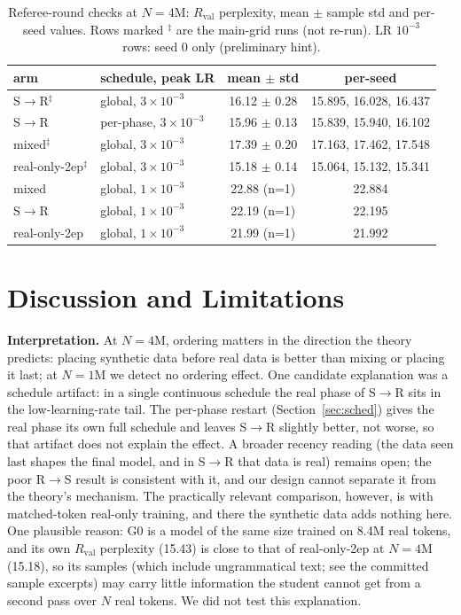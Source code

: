 \documentclass[conference]{IEEEtran}
\newcommand{\SR}{S$\to$R}
\newcommand{\RS}{R$\to$S}
\begin{document}
\begin{table}[t]
\centering
\caption{Referee-round checks at $N{=}4$M: $R_{\text{val}}$ perplexity, mean $\pm$ sample std and per-seed values. Rows marked $^\ddagger$ are the main-grid runs (not re-run). LR $10^{-3}$ rows: seed 0 only (preliminary hint).}
\label{tab:sched}
\footnotesize
\setlength{\tabcolsep}{3pt}
\begin{tabular}{@{}llcc@{}}
\toprule
arm & schedule, peak LR & mean $\pm$ std & per-seed \\
\midrule
\SR$^\ddagger$ & global, $3\!\times\!10^{-3}$ & 16.12 $\pm$ 0.28 & 15.895, 16.028, 16.437 \\
\SR & per-phase, $3\!\times\!10^{-3}$ & 15.96 $\pm$ 0.13 & 15.839, 15.940, 16.102 \\
mixed$^\ddagger$ & global, $3\!\times\!10^{-3}$ & 17.39 $\pm$ 0.20 & 17.163, 17.462, 17.548 \\
real-only-2ep$^\ddagger$ & global, $3\!\times\!10^{-3}$ & 15.18 $\pm$ 0.14 & 15.064, 15.132, 15.341 \\
\midrule
mixed & global, $1\!\times\!10^{-3}$ & 22.88 (n=1) & 22.884 \\
\SR & global, $1\!\times\!10^{-3}$ & 22.19 (n=1) & 22.195 \\
real-only-2ep & global, $1\!\times\!10^{-3}$ & 21.99 (n=1) & 21.992 \\
\bottomrule
\end{tabular}
\end{table}

\section{Discussion and Limitations}
\textbf{Interpretation.} At $N{=}4$M, ordering matters in the direction the theory predicts: placing synthetic data before real data is better than mixing or placing it last; at $N{=}1$M we detect no ordering effect. One candidate explanation was a schedule artifact: in a single continuous schedule the real phase of \SR{} sits in the low-learning-rate tail. The per-phase restart (Section~\ref{sec:sched}) gives the real phase its own full schedule and leaves \SR{} slightly better, not worse, so that artifact does not explain the effect. A broader recency reading (the data seen last shapes the final model, and in \SR{} that data is real) remains open; the poor \RS{} result is consistent with it, and our design cannot separate it from the theory's mechanism. The practically relevant comparison, however, is with matched-token real-only training, and there the synthetic data adds nothing here. One plausible reason: G0 is a model of the same size trained on 8.4M real tokens, and its own $R_{\text{val}}$ perplexity (15.43) is close to that of real-only-2ep at $N{=}4$M (15.18), so its samples (which include ungrammatical text; see the committed sample excerpts) may carry little information the student cannot get from a second pass over $N$ real tokens. We did not test this explanation.
\end{document}
